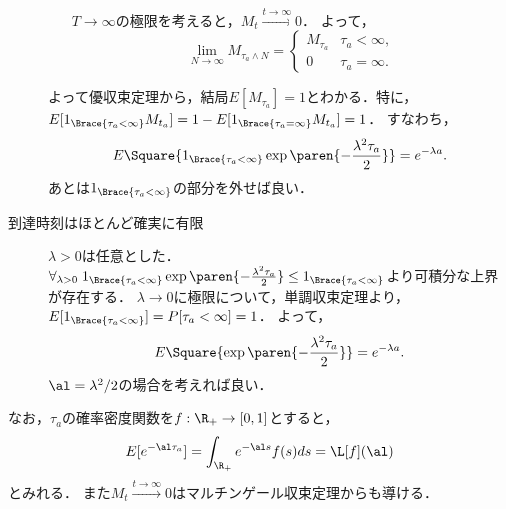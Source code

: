 \documentclass[uplatex,dvipdfmx]{jsreport}
\begin{document}
\begin{Proof}
\begin{description}
\begin{enumerate}[(a)]
            $T\to\infty$の極限を考えると，$M_t\xrightarrow{t\to\infty}0$．
            よって，
            \[\lim_{N\to\infty}M_{\tau_a\land N}=\begin{cases}
                M_{\tau_a}&\tau_a<\infty,\\
                0&\tau_a=\infty.
            \end{cases}\]
        \end{enumerate}
        よって優収束定理から，結局$E[M_{\tau_a}]=1$とわかる．特に，
        $E[1_{\Brace{\tau_a<\infty}}M_{t_a}]=1-E[1_{\Brace{\tau_a=\infty}}M_{t_a}]=1$．
        すなわち，
        \[E\Square{1_{\Brace{\tau_a<\infty}}\exp\paren{-\frac{\lambda^2\tau_a}{2}}}=e^{-\lambda a}.\]
        あとは$1_{\Brace{\tau_a<\infty}}$の部分を外せば良い．
        \item[到達時刻はほとんど確実に有限] \mbox{}
        $\lambda>0$は任意とした．$\forall_{\lambda>0}\;1_{\Brace{\tau_a<\infty}}\exp\paren{-\frac{\lambda^2\tau_a}{2}}\le1_{\Brace{\tau_a<\infty}}$より可積分な上界が存在する．
        $\lambda\to0$に極限について，単調収束定理より，$E[1_{\Brace{\tau_a<\infty}}]=P[\tau_a<\infty]=1$．
        よって，
        \[E\Square{\exp\paren{-\frac{\lambda^2\tau_a}{2}}}=e^{-\lambda a}.\]
        $\al=\lambda^2/2$の場合を考えれば良い．
    \end{description}
\end{Proof}
\begin{remarks}
    なお，$\tau_a$の確率密度関数を$f:\R_+\to[0,1]$とすると，
    \[E[e^{-\al\tau_a}]=\int_{\R_+}e^{-\al s}f(s)ds=\L[f](\al)\]
    とみれる．
    また$M_t\xrightarrow{t\to\infty}0$はマルチンゲール収束定理からも導ける．
\end{remarks}
\end{document}

